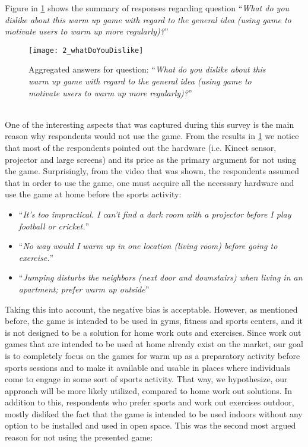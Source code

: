 Figure in \ref{fig:2_whatDoYouDislike} shows the summary of responses regarding question ``\textit{What do you dislike about this warm up game with regard to the general idea (using game to motivate users to warm up more regularly)?}''\\
\begin{figure}[h]
    \centering
    \texttt{[image: 2\_whatDoYouDislike]}
    \caption{Aggregated answers for question: ``\textit{What do you dislike about this warm up game with regard to the general idea (using game to motivate users to warm up more regularly)?}''}
    \label{fig:2_whatDoYouDislike}
\end{figure}\\ 
One of the interesting aspects that was captured during this survey is the main reason why respondents would not use the game. From the results in \ref{fig:2_whatDoYouDislike} we notice that most of the respondents pointed out the hardware (i.e. Kinect sensor, projector and large screens) and its price as the primary argument for not using the game. Surprisingly, from the video that was shown, the respondents assumed that in order to use the game, one must acquire all the necessary hardware and use the game at home before the sports activity:
\begin{itemize}
\item ``\textit{It's too impractical. I can't find a dark room with a projector before I play football or cricket.}''
\item ``\textit{No way would I warm up in one location (living room) before going to exercise.}''
\item ``\textit{Jumping disturbs the neighbors (next door and downstairs) when living in an apartment; prefer warm up outside}''
\end{itemize} 
Taking this into account, the negative bias is acceptable. However, as mentioned before, the game is intended to be used in gyms, fitness and sports centers, and it is not designed to be a solution for home work outs and exercises. Since work out games that are intended to be used at home already exist on the market, our goal is to completely focus on the games for warm up as a preparatory activity before sports sessions and to make it available and usable in places where individuals come to engage in some sort of sports activity. That way, we hypothesize, our approach will be more likely utilized, compared to home work out solutions. In addition to this, respondents who prefer sports and work out exercises outdoor, mostly disliked the fact that the game is intended to be used indoors without any option to be installed and used in open space. This was the second most argued reason for not using the presented game:
